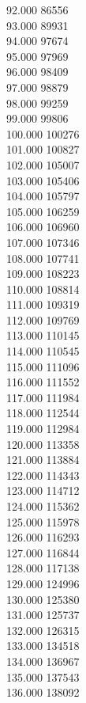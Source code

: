{ 92.000	86556 \\
 93.000	89931 \\
 94.000	97674 \\
 95.000	97969 \\
 96.000	98409 \\
 97.000	98879 \\
 98.000	99259 \\
 99.000	99806 \\
 100.000	100276 \\
 101.000	100827 \\
 102.000	105007 \\
 103.000	105406 \\
 104.000	105797 \\
 105.000	106259 \\
 106.000	106960 \\
 107.000	107346 \\
 108.000	107741 \\
 109.000	108223 \\
 110.000	108814 \\
 111.000	109319 \\
 112.000	109769 \\
 113.000	110145 \\
 114.000	110545 \\
 115.000	111096 \\
 116.000	111552 \\
 117.000	111984 \\
 118.000	112544 \\
 119.000	112984 \\
 120.000	113358 \\
 121.000	113884 \\
 122.000	114343 \\
 123.000	114712 \\
 124.000	115362 \\
 125.000	115978 \\
 126.000	116293 \\
 127.000	116844 \\
 128.000	117138 \\
 129.000	124996 \\
 130.000	125380 \\
 131.000	125737 \\
 132.000	126315 \\
 133.000	134518 \\
 134.000	136967 \\
 135.000	137543 \\
 136.000	138092 \\
}
